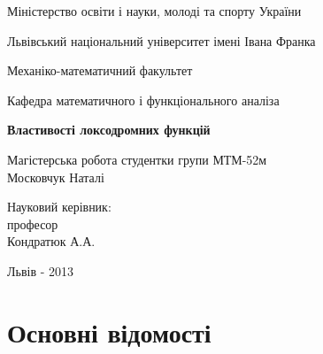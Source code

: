 \documentclass[12pt,a4paper]{article}
\begin{document}

\pagestyle{empty}
\setlength{\parindent}{1.5cm}
\fontsize{14pt}{6mm}\selectfont

\begin{center}
  Міністерство освіти і науки, молоді та спорту України
  
  Львівський національний університет імені Івана Франка

  Механіко-математичний факультет
\end{center}

\vspace{1cm}

\begin{flushright}
  Кафедра математичного і функціонального аналіза
\end{flushright}

\vspace{4cm}

\begin{center}
  {\bfseries\Large Властивості локсодромних функцій}
\end{center}

\vspace{2cm}

\begin{small}
\begin{flushleft}
  Магістерська робота студентки 
  групи МТМ-52м\\
  Московчук Наталі\linebreak
  
  Науковий керівник:\\
  професор\\
  Кондратюк А.А.
\end{flushleft}
\end{small}

\vspace{4cm}

\begin{center}
  Львів - 2013 
\end{center}

\clearpage


\fontsize{14pt}{6mm}\selectfont

\tableofcontents
\clearpage
\pagestyle{plain}

\section{Основні відомості}
\end{document}
